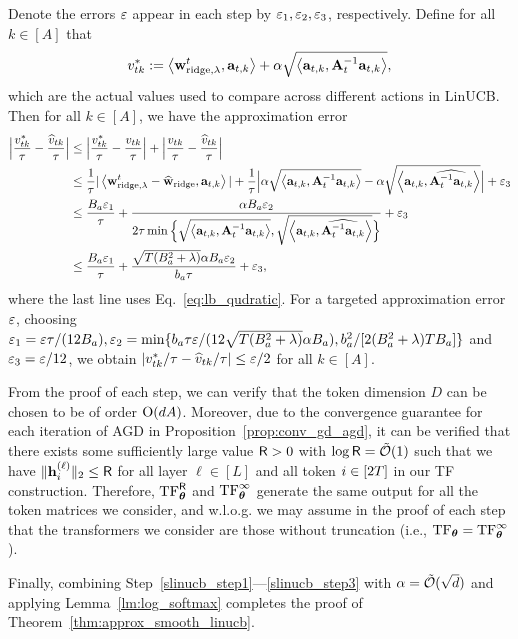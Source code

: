 Denote the errors $\varepsilon$ appear in each step by $\varepsilon_1,\varepsilon_2,\varepsilon_3$, respectively. Define for all $k\in[A]$ that $$
v^{*}_{tk}:=\left\langle{\mathbf w}^t_{{\rm ridge},\lambda},{\mathbf a}_{t,k}\right\rangle+\alpha\sqrt{\left\langle{\mathbf a}_{t,k}, {{\mathbf A}_t^{-1} {\mathbf a}_{t,k}}\right\rangle},
$$ which are the actual values used to compare across different actions in LinUCB. Then  for all $k\in[A]$, we have the approximation error
\begin{align*}
    \Big|\frac{v_{tk}^*}{{\tau}}-\frac{\widehat v_{tk}}{{\tau}}\Big|
    &\leq
     \Big|\frac{v_{tk}^*}{{\tau}}- \frac{v_{tk}}{{\tau}}\Big|+ \Big|\frac{v_{tk}}{{\tau}}-\frac{\widehat v_{tk}}{{\tau}}\Big|\\
     &\leq
   \frac1{{\tau}} |\left\langle{\mathbf w}^t_{{\rm ridge},\lambda}-\widehat {{\mathbf w}}_{{\rm ridge}},{\mathbf a}_{t,k}\right\rangle|+\frac1{{\tau}}\Big|\alpha\sqrt{\left\langle{\mathbf a}_{t,k}, {{\mathbf A}_t^{-1} {\mathbf a}_{t,k}}\right\rangle}-\alpha\sqrt{\left\langle{\mathbf a}_{t,k}, \widehat{{\mathbf A}_t^{-1} {\mathbf a}_{t,k}}\right\rangle}\Big|+\varepsilon_3
    \\&\leq
    \frac{B_a\varepsilon_1}{{\tau}}+\frac{\alpha B_a\varepsilon_2}{2{\tau}\min\Big\{\sqrt{\left\langle{\mathbf a}_{t,k}, {{\mathbf A}_t^{-1} {\mathbf a}_{t,k}}\right\rangle},\sqrt{\left\langle{\mathbf a}_{t,k}, \widehat{{\mathbf A}_t^{-1} {\mathbf a}_{t,k}}\right\rangle}
    \Big\}}+\varepsilon_3\\
    &\leq \frac{B_a\varepsilon_1}{{\tau}}+\frac{\sqrt{T(B_a^2+\lambda)}  \alpha B_a\varepsilon_2}{b_a{\tau}}+\varepsilon_3,
\end{align*}
where the last line uses Eq.~\eqref{eq:lb_qudratic}.
For a targeted approximation error $\varepsilon$, choosing
 $\varepsilon_1=\varepsilon{\tau}/(12B_a),\varepsilon_2=\min\{b_a{\tau}\varepsilon/(12\sqrt{T(B_a^2+\lambda)}  \alpha B_a),b_a^2/[2(B_a^2+\lambda)TB_a]\}$ and $\varepsilon_3=\varepsilon/12$, we obtain $|v_{tk}^*/{\tau}-\widehat v_{tk}/{\tau}|\leq \varepsilon/2$ for all $k\in[A]$.

 From the proof of each step, we can verify that the token dimension $D$ can be chosen to be of order ${\mathrm{O}}(dA)$. Moreover, due to the convergence guarantee for each iteration of AGD in Proposition~\ref{prop:conv_gd_agd}, it can be verified that there exists some sufficiently large value ${\mathsf{R}}>0$ with $\log {\mathsf{R}}={\tilde{\mathcal O}}(1)$ such that  we have $\| {\mathbf h}_i^{{(\ell)}} \|_{2} \leq{\mathsf{R}}$
 for all layer $\ell\in[L]$ and all token $i\in[2{T}]$ in our TF construction. Therefore, ${\rm TF}^{\mathsf{R}}_{\boldsymbol \theta}$ and ${\rm TF}^\infty_{\boldsymbol \theta}$ generate the same output for all the token matrices we consider, and w.l.o.g. we  may assume in the proof of each step  that the  transformers we consider are those without truncation (i.e., ${\rm TF}_{\boldsymbol \theta}={\rm TF}_{\boldsymbol \theta}^\infty$).

Finally, combining Step~\ref{slinucb_step1}---\ref{slinucb_step3} with $\alpha={\tilde{\mathcal O}}(\sqrt{d})$ and applying Lemma~\ref{lm:log_softmax} completes the proof of Theorem~\ref{thm:approx_smooth_linucb}.






